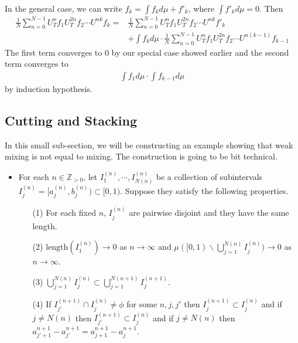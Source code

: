 \documentclass[10pt,a4paper]{report}
\newenvironment{proof}
{\begin{changemargin}{1cm}{0.5cm} 
	}%
	{\end{changemargin}
}
\begin{document}
\begin{proof}
\quad In the general case, we can write $f_k = \int f_k d\mu + f'_{k}$, where $\int f'_k d\mu =0$. Then
\begin{align*}
\frac{1}{N} \sum_{n=0}^{N-1}  U_T^n f_1 U^{2n}_T f_2 \cdots U^{nk} f_k =& \frac{1}{N} \sum_{n=0}^{N-1}  U_T^n f_1 U^{2n}_T f_2 \cdots U^{nk} f'_k \\
& + \int f_{k} d\mu \cdot \frac{1}{N} \sum_{n=0}^{N-1}  U_T^n f_1 U^{2n}_T f_2 \cdots U^{n(k-1)} f_{k-1}
\end{align*}
The first term converges to 0 by our special case showed earlier and the second term converges to
\begin{align*}
\int f_1 d\mu \cdot \int f_{k-1} d\mu
\end{align*}
by induction hypothesis.

\eop
\end{proof}
\s

\subsection*{Cutting and Stacking}

In this small sub-section, we will be constructing an example showing that weak mixing is not equal to mixing. The construction is going to be bit technical.
\begin{itemize}
\item For each $n\in \mathbb{Z}_{>0}$, let $I_1^{(n)}, \cdots, I_{N(n)}^{(n)}$ be a collection of subintervals $I_j^{(n)} = [a_j^{(n)}, b_j^{(n)} ) \subset [0,1)$. Suppose they satisfy the following properties.
\begin{itemize}
\item[(1)] For each fixed $n$, $I_j^{(n)}$ are pairwise disjoint and they have the same length.
\item[(2)] $\text{length}(I_1^{(n)}) \rightarrow 0$ as $n\rightarrow \infty$ and $\mu([0,1) \backslash \bigcup_{j=1}^{N(n)} I_j^{(n)}) \rightarrow 0$ as $n\rightarrow \infty$.
\item[(3)] $\bigcup_{j=1}^{N(n)} I_j^{(n)} \subset \bigcup_{j=1}^{N(n+1)} I^{(n+1)}_j$.
\item[(4)] If $I_{j'}^{(n+1)} \cap I_j^{(n)} \neq \phi$ for some $n,j,j'$ then $I_j^{(n+1)} \subset I_j^{(n)}$ and if $j \neq N(n)$ then $I_{j'}^{(n+1)} \subset I_j^{(n)}$ and if $j \neq N(n)$ then $a^{n+1}_{j'+1} - a^{n+1}_{j'} = a^{n+1}_{j+1} - a^{n+1}_{j}$. 
\end{itemize}
\end{itemize}
\s
\end{document}
